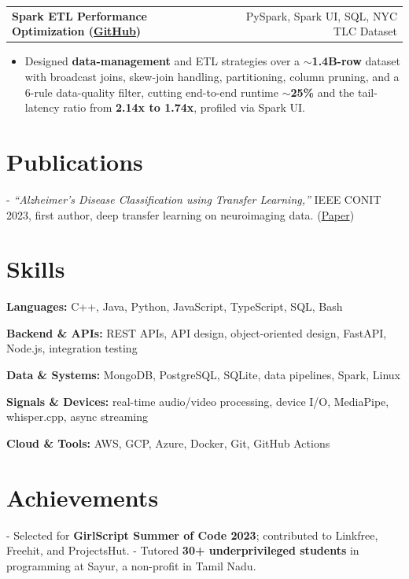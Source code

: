 \documentclass[letterpaper,11pt]{article}
\makeatletter
\newcommand{\projItem}[2]{%
  \vspace{6pt}
  \begin{tabular*}{\textwidth}{@{}l@{\extracolsep{\fill}}r@{}}
    \textbf{#1} & #2 \\
  \end{tabular*}\par\vspace{-2pt}
}
\newcommand{\skillLine}[2]{\textbf{#1:} #2\par\vspace{2pt}}
\newcommand{\inlineBlock}[1]{{\setlength{\leftskip}{0.18in}\small #1\par}}
\makeatother
\begin{document}
\projItem{Spark ETL Performance Optimization {\normalfont\small(\href{https://github.com/Deva-1903/Spark-ETL-Optimization}{GitHub})}}{PySpark, Spark UI, SQL, NYC TLC Dataset}
\begin{itemize}
  \item Designed \textbf{data-management} and ETL strategies over a \textbf{$\sim$1.4B-row} dataset with broadcast joins, skew-join handling, partitioning, column pruning, and a 6-rule data-quality filter, cutting end-to-end runtime \textbf{$\sim$25\%} and the tail-latency ratio from \textbf{2.14x to 1.74x}, profiled via Spark UI.
\end{itemize}

\section{Publications}
\inlineBlock{- \textit{``Alzheimer's Disease Classification using Transfer Learning,''} IEEE CONIT 2023, first author, deep transfer learning on neuroimaging data. {\normalfont\small(\href{https://ieeexplore.ieee.org/document/10205760}{Paper})}}

\section{Skills}
\skillLine{Languages}{C++, Java, Python, JavaScript, TypeScript, SQL, Bash}
\skillLine{Backend \& APIs}{REST APIs, API design, object-oriented design, FastAPI, Node.js, integration testing}
\skillLine{Data \& Systems}{MongoDB, PostgreSQL, SQLite, data pipelines, Spark, Linux}
\skillLine{Signals \& Devices}{real-time audio/video processing, device I/O, MediaPipe, whisper.cpp, async streaming}
\skillLine{Cloud \& Tools}{AWS, GCP, Azure, Docker, Git, GitHub Actions}

\section{Achievements}
\inlineBlock{- Selected for \textbf{GirlScript Summer of Code 2023}; contributed to Linkfree, Freehit, and ProjectsHut. - Tutored \textbf{30+ underprivileged students} in programming at Sayur, a non-profit in Tamil Nadu.}
\end{document}
